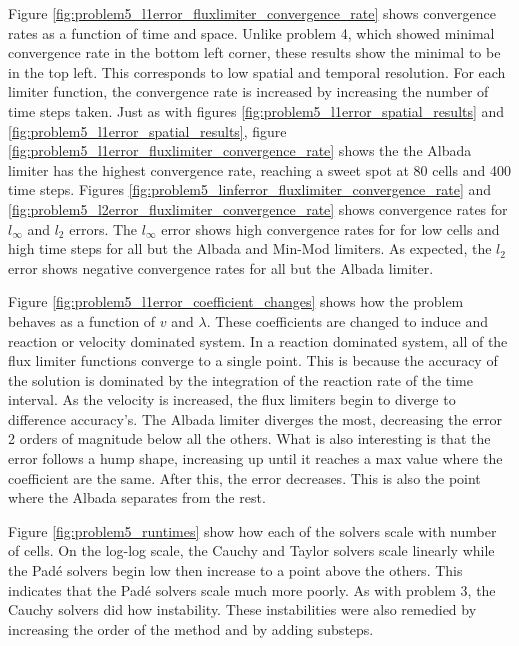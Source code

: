 Figure \ref{fig:problem5_l1error_fluxlimiter_convergence_rate} shows convergence rates as a function of time and space. Unlike problem 4, which showed minimal convergence rate in the bottom left corner, these results show the minimal to be in the top left. This corresponds to low spatial and temporal resolution. For each limiter function, the convergence rate is increased by increasing the number of time steps taken. Just as with figures \ref{fig:problem5_l1error_spatial_results} and \ref{fig:problem5_l1error_spatial_results}, figure \ref{fig:problem5_l1error_fluxlimiter_convergence_rate} shows the the Albada limiter has the highest convergence rate, reaching a sweet spot at 80 cells and 400 time steps. Figures \ref{fig:problem5_linferror_fluxlimiter_convergence_rate} and \ref{fig:problem5_l2error_fluxlimiter_convergence_rate} shows convergence rates for $l_{\infty}$ and $l_{2}$ errors. The $l_{\infty}$ error shows high convergence rates for for low cells and high time steps for all but the Albada and Min-Mod limiters. As expected, the $l_{2}$ error shows negative convergence rates for all but the Albada limiter. 

Figure \ref{fig:problem5_l1error_coefficient_changes} shows how the problem behaves as a function of $v$ and $\lambda$. These coefficients are changed to induce and reaction or velocity dominated system. In a reaction dominated system, all of the flux limiter functions converge to a single point. This is because the accuracy of the solution is dominated by the integration of the reaction rate of the time interval. As the velocity is increased, the flux limiters begin to diverge to difference accuracy's. The Albada limiter diverges the most, decreasing the error 2 orders of magnitude below all the others. What is also interesting is that the error follows a hump shape, increasing up until it reaches a max value where the coefficient are the same. After this, the error decreases. This is also the point where the Albada separates from the rest. 

Figure \ref{fig:problem5_runtimes} show how each of the solvers scale with number of cells. On the log-log scale, the Cauchy and Taylor solvers scale linearly while the Pad\'e solvers begin low then increase to a point above the others. This indicates that the Pad\'e solvers scale much more poorly. As with problem 3, the Cauchy solvers did how instability. These instabilities were also remedied by increasing the order of the method and by adding substeps. 

\clearpage


